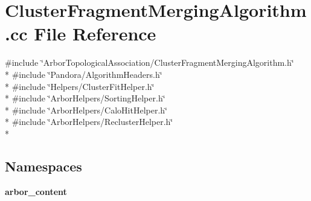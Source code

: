 \section{Cluster\+Fragment\+Merging\+Algorithm.\+cc File Reference}
\label{ClusterFragmentMergingAlgorithm_8cc}
{\ttfamily \#include \char`\"{}Arbor\+Topological\+Association/\+Cluster\+Fragment\+Merging\+Algorithm.\+h\char`\"{}}\\*
{\ttfamily \#include \char`\"{}Pandora/\+Algorithm\+Headers.\+h\char`\"{}}\\*
{\ttfamily \#include \char`\"{}Helpers/\+Cluster\+Fit\+Helper.\+h\char`\"{}}\\*
{\ttfamily \#include \char`\"{}Arbor\+Helpers/\+Sorting\+Helper.\+h\char`\"{}}\\*
{\ttfamily \#include \char`\"{}Arbor\+Helpers/\+Calo\+Hit\+Helper.\+h\char`\"{}}\\*
{\ttfamily \#include \char`\"{}Arbor\+Helpers/\+Recluster\+Helper.\+h\char`\"{}}\\*
\subsection*{Namespaces}
\begin{DoxyCompactItemize}
\item 
 {\bf arbor\+\_\+content}
\end{DoxyCompactItemize}
